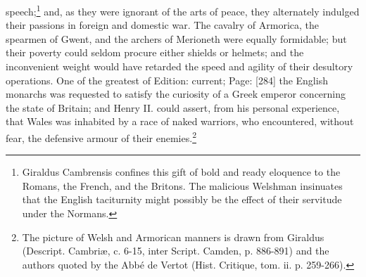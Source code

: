 speech;\footnote{Giraldus Cambrensis confines this gift of bold and ready eloquence to the Romans, the French, and the Britons. The malicious Welshman insinuates that the English taciturnity might possibly be the effect of their servitude under the Normans.} and, as they were ignorant of the arts of peace, they alternately indulged their passions in foreign and domestic war. The cavalry of Armorica, the spearmen of Gwent, and the archers of Merioneth were equally formidable; but their poverty could seldom procure either shields or helmets; and the inconvenient weight would have retarded the speed and agility of their desultory operations. One of the greatest of Edition: current; Page: [284] the English monarchs was requested to satisfy the curiosity of a Greek emperor concerning the state of Britain; and Henry II. could assert, from his personal experience, that Wales was inhabited by a race of naked warriors, who encountered, without fear, the defensive armour of their enemies.\footnote{The picture of Welsh and Armorican manners is drawn from Giraldus (Descript. Cambriæ, c. 6-15, inter Script. Camden, p. 886-891) and the authors quoted by the Abbé de Vertot (Hist. Critique, tom. ii. p. 259-266).}

